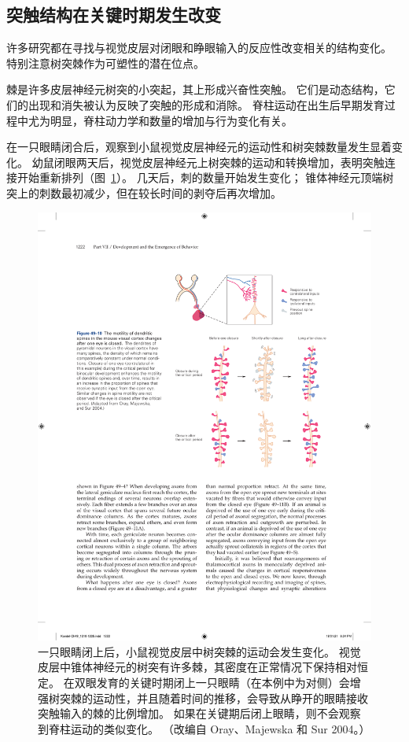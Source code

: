 \subsection{突触结构在关键时期发生改变}

许多研究都在寻找与视觉皮层对闭眼和睁眼输入的反应性改变相关的结构变化。
特别注意树突棘作为可塑性的潜在位点。


棘是许多皮层神经元树突的小突起，其上形成兴奋性突触。
它们是动态结构，它们的出现和消失被认为反映了突触的形成和消除。
脊柱运动在出生后早期发育过程中尤为明显，脊柱动力学和数量的增加与行为变化有关。


在一只眼睛闭合后，观察到小鼠视觉皮层神经元的运动性和树突棘数量发生显着变化。
幼鼠闭眼两天后，视觉皮层神经元上树突棘的运动和转换增加，表明突触连接开始重新排列（图~\ref{fig:49_10}）。
几天后，刺的数量开始发生变化；
锥体神经元顶端树突上的刺数最初减少，但在较长时间的剥夺后再次增加。


\begin{figure}[htbp]
	\centering
	\includegraphics[width=0.7\linewidth]{chap49/fig_49_10}
	\caption{一只眼睛闭上后，小鼠视觉皮层中树突棘的运动会发生变化。 视觉皮层中锥体神经元的树突有许多棘，其密度在正常情况下保持相对恒定。 在双眼发育的关键时期闭上一只眼睛（在本例中为对侧）会增强树突棘的运动性，并且随着时间的推移，会导致从睁开的眼睛接收突触输入的棘的比例增加。 如果在关键期后闭上眼睛，则不会观察到脊柱运动的类似变化。 （改编自 Oray、Majewska 和 Sur 2004。）}
	\label{fig:49_10}
\end{figure}


